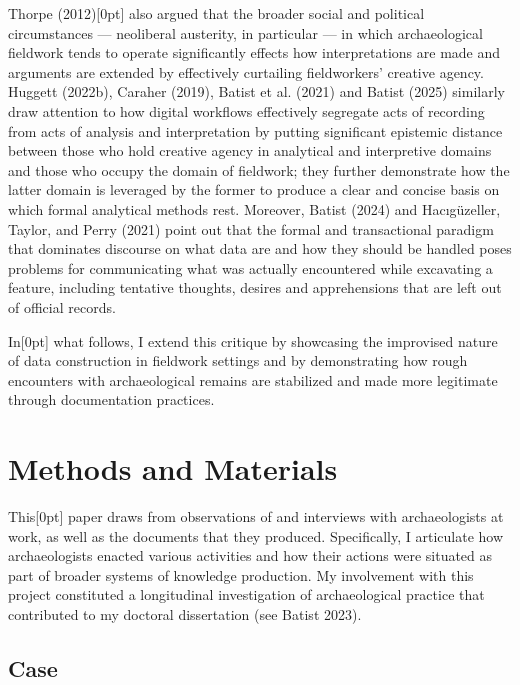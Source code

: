 \documentclass[
]{article}
\newcommand{\paragraphnumber}[1]{\marginnote{\color{lightgray}\tiny{#1}}[0pt]}
\begin{document}
Thorpe (2012)\paragraphnumber{[6]} also argued that the broader social
and political circumstances --- neoliberal austerity, in particular ---
in which archaeological fieldwork tends to operate significantly effects
how interpretations are made and arguments are extended by effectively
curtailing fieldworkers' creative agency. Huggett (2022b), Caraher
(2019), Batist et al. (2021) and Batist (2025) similarly draw attention
to how digital workflows effectively segregate acts of recording from
acts of analysis and interpretation by putting significant epistemic
distance between those who hold creative agency in analytical and
interpretive domains and those who occupy the domain of fieldwork; they
further demonstrate how the latter domain is leveraged by the former to
produce a clear and concise basis on which formal analytical methods
rest. Moreover, Batist (2024) and Hacıgüzeller, Taylor, and Perry (2021)
point out that the formal and transactional paradigm that dominates
discourse on what data are and how they should be handled poses problems
for communicating what was actually encountered while excavating a
feature, including tentative thoughts, desires and apprehensions that
are left out of official records.

In\paragraphnumber{[7]} what follows, I extend this critique by
showcasing the improvised nature of data construction in fieldwork
settings and by demonstrating how rough encounters with archaeological
remains are stabilized and made more legitimate through documentation
practices.

\section{Methods and Materials}\label{methods-and-materials}

This\paragraphnumber{[8]} paper draws from observations of and
interviews with archaeologists at work, as well as the documents that
they produced. Specifically, I articulate how archaeologists enacted
various activities and how their actions were situated as part of
broader systems of knowledge production. My involvement with this
project constituted a longitudinal investigation of archaeological
practice that contributed to my doctoral dissertation (see Batist 2023).

\subsection{Case}\label{case}
\end{document}
